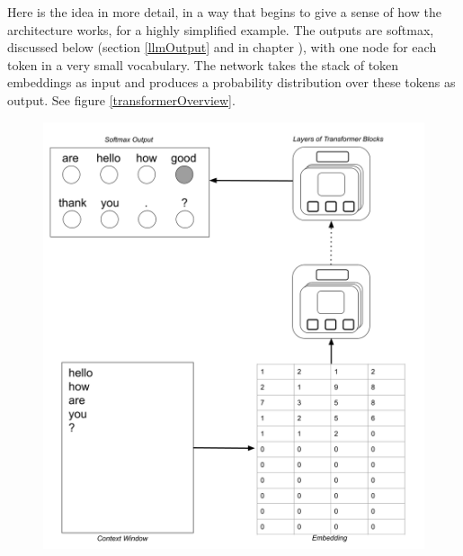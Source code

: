 Here is the idea in more detail, in a way that begins to give a sense of how
the architecture works, for a highly simplified example. The outputs are
softmax, discussed below (section \ref{llmOutput} and in chapter
), with one node for each token in a very small
vocabulary. The network takes the stack of token embeddings as input and
produces a probability distribution over these tokens as output.  See figure
\ref{transformerOverview}.

\begin{figure}[ht]
\centering
\includegraphics[scale=.2]{./images/TransformerOverview.png} \; \; \; 

\end{figure}
